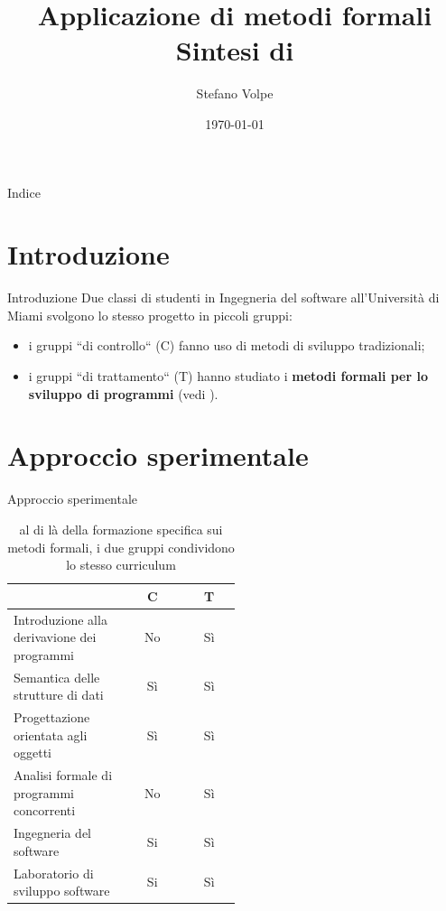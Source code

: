 \documentclass{beamer}
\title{
	Applicazione di metodi formali \\
	\small Sintesi di \cite{sobel}
}
\author{Stefano Volpe}
\institute{Università di Bologna}
\date{\today}
\begin{document}
\begin{frame}
	\titlepage
\end{frame}

\begin{frame}{Indice}
	\tableofcontents
\end{frame}

\section{Introduzione}
\begin{frame}{Introduzione}
	Due classi di studenti in Ingegneria del software all'Università di Miami
	svolgono lo stesso progetto in piccoli gruppi:
	\begin{itemize}
		\item i gruppi ``di controllo`` (C) fanno uso di metodi di sviluppo
		      tradizionali;
		\item i gruppi ``di trattamento`` (T) hanno studiato i \textbf{metodi
			      formali per lo sviluppo di programmi} (vedi \cite{cohen}).
	\end{itemize}
\end{frame}

\section{Approccio sperimentale}
\begin{frame}{Approccio sperimentale}
	\begin{table}
		\begin{tabular}{|p{0.5\linewidth}|c|c|}
			\hline
			                                            & C  & T  \\
			\hline
			Introduzione alla derivavione dei programmi & No & Sì \\
			\hline
			Semantica delle strutture di dati           & Sì & Sì \\
			\hline
			Progettazione orientata agli oggetti        & Sì & Sì \\
			\hline
			Analisi formale di programmi concorrenti    & No & Sì \\
			\hline
			Ingegneria del software                     & Si & Sì \\
			\hline
			Laboratorio di sviluppo software            & Si & Sì \\
			\hline
		\end{tabular}
		\caption{al di là della formazione specifica sui metodi formali, i due
			gruppi condividono lo stesso curriculum}
	\end{table}

\end{frame}
\end{document}

